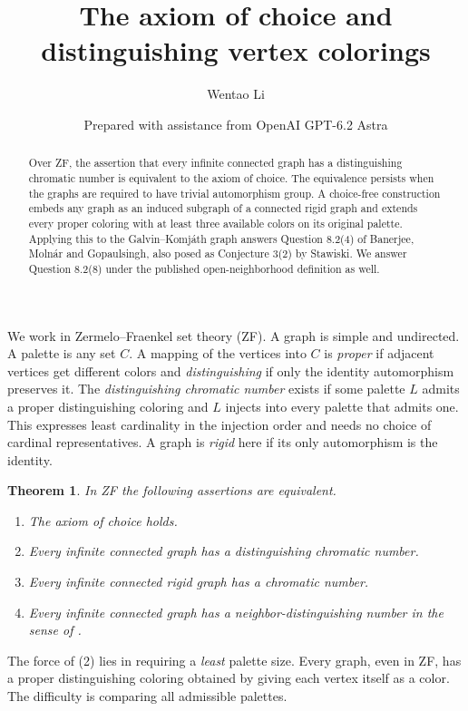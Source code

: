 \documentclass[11pt]{article}
\title{The axiom of choice and distinguishing vertex colorings}
\author{Wentao Li}
\date{Prepared with assistance from OpenAI GPT-6.2 Astra}
\newtheorem{theorem}{Theorem}
\begin{document}
\maketitle
\begin{abstract}
Over ZF, the assertion that every infinite connected graph has a distinguishing chromatic number is equivalent to the axiom of choice. The equivalence persists when the graphs are required to have trivial automorphism group. A choice-free construction embeds any graph as an induced subgraph of a connected rigid graph and extends every proper coloring with at least three available colors on its original palette. Applying this to the Galvin--Komj\'ath graph answers Question 8.2(4) of Banerjee, Moln\'ar and Gopaulsingh, also posed as Conjecture 3(2) by Stawiski. We answer Question 8.2(8) under the published open-neighborhood definition as well.
\end{abstract}

We work in Zermelo--Fraenkel set theory (ZF). A graph is simple and undirected. A palette is any set $C$. A mapping of the vertices into $C$ is \emph{proper} if adjacent vertices get different colors and \emph{distinguishing} if only the identity automorphism preserves it. The \emph{distinguishing chromatic number} exists if some palette $L$ admits a proper distinguishing coloring and $L$ injects into every palette that admits one. This expresses least cardinality in the injection order and needs no choice of cardinal representatives. A graph is \emph{rigid} here if its only automorphism is the identity.

\begin{theorem}\label{main}
In ZF the following assertions are equivalent.
\begin{enumerate}
\item The axiom of choice holds.
\item Every infinite connected graph has a distinguishing chromatic number.
\item Every infinite connected rigid graph has a chromatic number.
\item Every infinite connected graph has a neighbor-distinguishing number in the sense of \cite[Definition 9.1(9)]{bmg}.
\end{enumerate}
\end{theorem}

The force of (2) lies in requiring a \emph{least} palette size. Every graph, even in ZF, has a proper distinguishing coloring obtained by giving each vertex itself as a color. The difficulty is comparing all admissible palettes.
\end{document}
